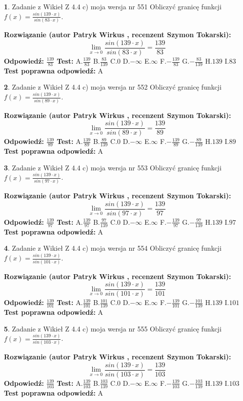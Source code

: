 \documentclass[12pt, a4paper]{article}
\theoremstyle{definition} %
\newtheorem{zad}{}
\newcommand{\zadStart}[1]{\begin{zad}#1\newline}
\newcommand{\zadStop}{\end{zad}}
\newcommand{\rozwStart}[2]{\noindent \textbf{Rozwiązanie (autor #1 , recenzent #2): }\newline}
\newcommand{\rozwStop}{\newline}
\newcommand{\odpStart}{\noindent \textbf{Odpowiedź:}\newline}
\newcommand{\odpStop}{\newline}
\newcommand{\testStart}{\noindent \textbf{Test:}\newline}
\newcommand{\testStop}{\newline}
\newcommand{\kluczStart}{\noindent \textbf{Test poprawna odpowiedź:}\newline}
\newcommand{\kluczStop}{\newline}
\begin{document}
\zadStart{Zadanie z Wikieł Z 4.4 c) moja wersja nr 551}
Obliczyć granicę funkcji $f(x)=\frac{sin(139\cdot x)}{sin(83\cdot x)}$.
\zadStop
\rozwStart{Patryk Wirkus}{Szymon Tokarski}
$$\lim\limits_{x\to 0}\frac{sin(139\cdot x)}{sin(83\cdot x)}=
\frac{139}{83}$$
\rozwStop
\odpStart
$\frac{139}{83}$
\odpStop
\testStart
A.$\frac{139}{83}$
B.$\frac{83}{139}$
C.$0$
D.$-\infty$
E.$\infty$
F.$-\frac{139}{83}$
G.$-\frac{83}{139}$
H.$139$
I.$83$
\testStop
\kluczStart
A
\kluczStop



\zadStart{Zadanie z Wikieł Z 4.4 c) moja wersja nr 552}
Obliczyć granicę funkcji $f(x)=\frac{sin(139\cdot x)}{sin(89\cdot x)}$.
\zadStop
\rozwStart{Patryk Wirkus}{Szymon Tokarski}
$$\lim\limits_{x\to 0}\frac{sin(139\cdot x)}{sin(89\cdot x)}=
\frac{139}{89}$$
\rozwStop
\odpStart
$\frac{139}{89}$
\odpStop
\testStart
A.$\frac{139}{89}$
B.$\frac{89}{139}$
C.$0$
D.$-\infty$
E.$\infty$
F.$-\frac{139}{89}$
G.$-\frac{89}{139}$
H.$139$
I.$89$
\testStop
\kluczStart
A
\kluczStop



\zadStart{Zadanie z Wikieł Z 4.4 c) moja wersja nr 553}
Obliczyć granicę funkcji $f(x)=\frac{sin(139\cdot x)}{sin(97\cdot x)}$.
\zadStop
\rozwStart{Patryk Wirkus}{Szymon Tokarski}
$$\lim\limits_{x\to 0}\frac{sin(139\cdot x)}{sin(97\cdot x)}=
\frac{139}{97}$$
\rozwStop
\odpStart
$\frac{139}{97}$
\odpStop
\testStart
A.$\frac{139}{97}$
B.$\frac{97}{139}$
C.$0$
D.$-\infty$
E.$\infty$
F.$-\frac{139}{97}$
G.$-\frac{97}{139}$
H.$139$
I.$97$
\testStop
\kluczStart
A
\kluczStop



\zadStart{Zadanie z Wikieł Z 4.4 c) moja wersja nr 554}
Obliczyć granicę funkcji $f(x)=\frac{sin(139\cdot x)}{sin(101\cdot x)}$.
\zadStop
\rozwStart{Patryk Wirkus}{Szymon Tokarski}
$$\lim\limits_{x\to 0}\frac{sin(139\cdot x)}{sin(101\cdot x)}=
\frac{139}{101}$$
\rozwStop
\odpStart
$\frac{139}{101}$
\odpStop
\testStart
A.$\frac{139}{101}$
B.$\frac{101}{139}$
C.$0$
D.$-\infty$
E.$\infty$
F.$-\frac{139}{101}$
G.$-\frac{101}{139}$
H.$139$
I.$101$
\testStop
\kluczStart
A
\kluczStop



\zadStart{Zadanie z Wikieł Z 4.4 c) moja wersja nr 555}
Obliczyć granicę funkcji $f(x)=\frac{sin(139\cdot x)}{sin(103\cdot x)}$.
\zadStop
\rozwStart{Patryk Wirkus}{Szymon Tokarski}
$$\lim\limits_{x\to 0}\frac{sin(139\cdot x)}{sin(103\cdot x)}=
\frac{139}{103}$$
\rozwStop
\odpStart
$\frac{139}{103}$
\odpStop
\testStart
A.$\frac{139}{103}$
B.$\frac{103}{139}$
C.$0$
D.$-\infty$
E.$\infty$
F.$-\frac{139}{103}$
G.$-\frac{103}{139}$
H.$139$
I.$103$
\testStop
\kluczStart
A
\kluczStop
\end{document}

